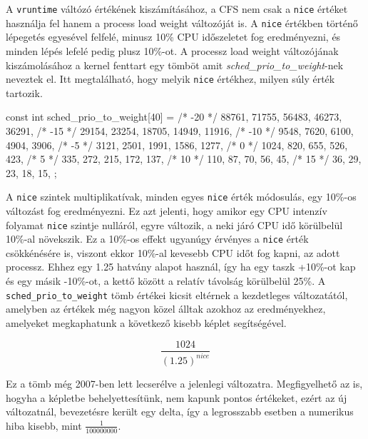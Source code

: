 A \texttt{vruntime} váltózó értékének kiszámításához, a CFS nem csak a \texttt{nice} értéket használja fel hanem a process load weight változóját is. A \texttt{nice} értékben történő lépegetés egyesével felfelé, minusz 10\% CPU időszeletet fog eredményezni, és minden lépés lefelé pedig plusz 10\%-ot. 
A processz load weight változójának kiszámolásához a kernel fenttart egy tömböt amit \textit{sched\_prio\_to\_weight}-nek neveztek el. Itt megtalálható, hogy melyik \texttt{nice} értékhez, milyen súly érték tartozik.
\begin{cpp}
const int sched_prio_to_weight[40] = {
 /* -20 */     88761,     71755,     56483,     46273,     36291,
 /* -15 */     29154,     23254,     18705,     14949,     11916,
 /* -10 */      9548,      7620,      6100,      4904,      3906,
 /*  -5 */      3121,      2501,      1991,      1586,      1277,
 /*   0 */      1024,       820,       655,       526,       423,
 /*   5 */       335,       272,       215,       172,       137,
 /*  10 */       110,        87,        70,        56,        45,
 /*  15 */        36,        29,        23,        18,        15,
};
\end{cpp}

A \texttt{nice} szintek multiplikatívak, minden egyes \texttt{nice} érték módosulás, egy 10\%-os változást fog eredményezni. Ez azt jelenti, hogy amikor egy CPU intenzív folyamat \texttt{nice} szintje nulláról, egyre változik, a neki járó CPU idő körülbelül 10\%-al növekszik.
Ez a 10\%-os effekt ugyanúgy érvényes a \texttt{nice} érték csökkénésére is, viszont ekkor 10\%-al kevesebb CPU időt fog kapni, az adott processz.
Ehhez egy 1.25 hatvány alapot használ, így ha egy taszk +10\%-ot kap és egy másik -10\%-ot, a kettő között a relatív távolság körülbelül 25\%.
A \texttt{sched\_prio\_to\_weight} tömb értékei kicsit eltérnek a kezdetleges változatától, amelyben az értékek még nagyon közel álltak azokhoz az eredményekhez, amelyeket megkaphatunk a következő kisebb képlet segítségével.

\begin{equation}
\frac{1024}{(1.25)^{nice}}
\end{equation}

Ez a tömb még 2007-ben lett lecserélve a jelenlegi változatra. 
Megfigyelhető az is, hogyha a képletbe behelyettesítünk, nem kapunk pontos értékeket, ezért az új változatnál, bevezetésre került egy delta, így a legrosszabb esetben a numerikus hiba kisebb, mint $\frac{1}{100000000}$.

